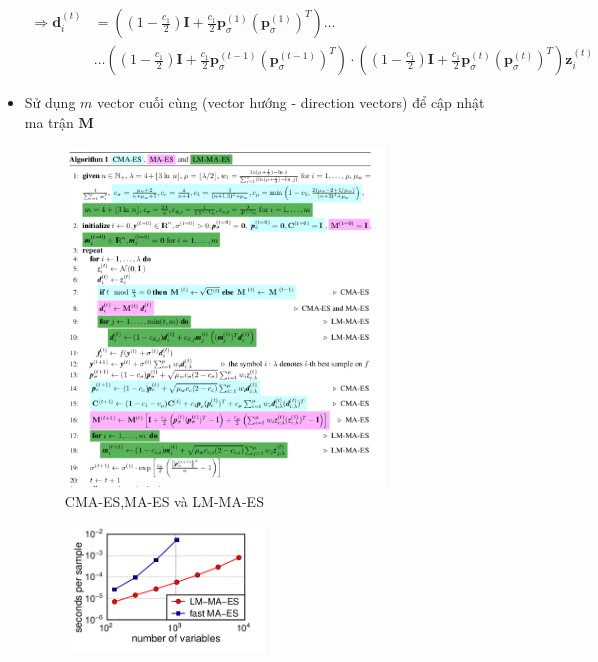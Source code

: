 \documentclass{book}
\begin{document}
\begin{itemize}
\begin{equation*}
\begin{aligned}
            \Rightarrow \mathbf{d}_i^{(t)} &= \left(\left(1-\frac{c_1}{2}\right)\mathbf{I} + \frac{c_1}{2}\mathbf{p}_\sigma^{(1)}(\mathbf{p}_\sigma^{(1)})^T\right)\dots \\
            & \dots\left(\left(1-\frac{c_1}{2}\right)\mathbf{I} + \frac{c_1}{2}\mathbf{p}_\sigma^{(t-1)}(\mathbf{p}_\sigma^{(t-1)})^T\right) \cdot \left(\left(1-\frac{c_1}{2}\right)\mathbf{I} + \frac{c_1}{2}\mathbf{p}_\sigma^{(t)}(\mathbf{p}_\sigma^{(t)})^T\right)\mathbf{z}_i^{(t)}
        \end{aligned}
    \end{equation*}
    \item Sử dụng $m$ vector cuối cùng (vector hướng - direction vectors) để cập nhật ma trận $\mathbf{M}$
    \begin{figure}[H]
        \centering
        \includegraphics[width=0.8\textwidth]{images/CMA-ES_MA-ES_and_LM-MA-ES.png}
        \caption{CMA-ES,MA-ES và LM-MA-ES}
        \label{fig:CMA-ES_MA-ES_and_LM-MA-ES}
    \end{figure}
    \begin{figure}[H]
        \centering
        \includegraphics[width=0.5\textwidth]{images/LM-MA-ES.png}

\end{figure}
\end{itemize}
\end{document}
